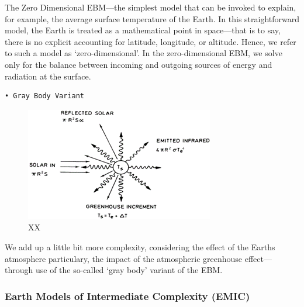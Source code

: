 \documentclass[12pt,oneside]{book}
\begin{document}
The Zero Dimensional EBM---the simplest model that can be invoked to
explain, for example, the average surface temperature of the Earth. In
this straightforward model, the Earth is treated as a mathematical point
in space---that is to say, there is no explicit accounting for latitude,
longitude, or altitude. Hence, we refer to such a model as
`zero-dimensional'. In the zero-dimensional EBM, we solve only for the
balance between incoming and outgoing sources of energy and radiation at
the surface.

\begin{verbatim}
• Gray Body Variant
\end{verbatim}

\begin{figure}

{\centering \includegraphics[width=0.8\linewidth]{figures/Figure710} 

}

\caption{XX}\label{fig:EnergyBalanceModels2}
\end{figure}

We add up a little bit more complexity, considering the effect of the
Earths atmosphere particulary, the impact of the atmospheric greenhouse
effect---through use of the so-called `gray body' variant of the EBM.

\subsubsection{Earth Models of Intermediate Complexity
(EMIC)}\label{earth-models-of-intermediate-complexity-emic}
\end{document}
